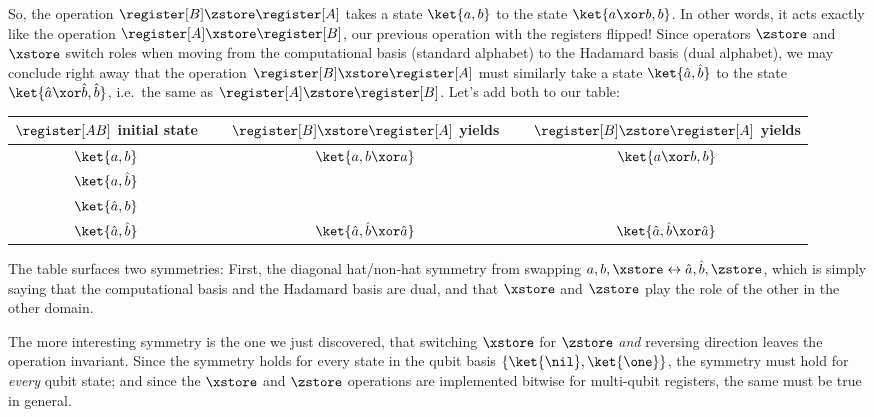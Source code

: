       So, the operation $\register[B] \zstore \register[A]$ takes a state
        $\ket{a,b}$ to the state $\ket{a \xor b, b}$. In other words, it acts
        exactly like the operation $\register[A] \xstore \register[B]$, our
        previous operation with the registers flipped! 
        Since operators $\zstore$ and $\xstore$ switch
        roles when moving from the computational basis (standard alphabet)
        to the Hadamard basis (dual alphabet), we may conclude right away 
        that the operation $\register[B] \xstore \register[A]$ must similarly
        take a state $\ket{\hat a, \hat b}$ to the state $\ket{\hat a \xor \hat b, \hat b}$,
        i.e.\ the same as $\register[A] \zstore \register[B]$.
        Let's add both to our table:
      \begin{steptable}
        \setlength{\extrarowheight}{2pt}
        \begin{tabular}{ccc}
          \toprule
          $\register[AB]$ initial state & 
            $\quad$ $\register[B] \xstore \register[A]$ yields $\quad$ & 
            $\register[B] \zstore \register[A]$ yields\\
          \midrule
          $\ket{a,b}$ & $\ket{a,b \xor a}$ & $\ket{a \xor b, b}$ \\
          $\ket{a,\hat b}$ &  &  \\
          $\ket{\hat a, b}$ &  &  \\
          $\ket{\hat a, \hat b}$ & $\ket{\hat a, \hat b \xor \hat a}$ & $\ket{\hat a, \hat b \xor \hat a}$ \\
          \bottomrule
        \end{tabular}
      \end{steptable}

      The table surfaces two symmetries: First, the diagonal hat/non-hat symmetry
        from swapping $a,b,\xstore \leftrightarrow \hat a, \hat b, \zstore$, 
        which is simply saying that the computational basis and the
        Hadamard basis are dual, and that $\xstore$ and $\zstore$ play the role
        of the other in the other domain.

      The more interesting symmetry is the one we just discovered, that switching $\xstore$ for
        $\zstore$ \emph{and} reversing direction leaves the
        operation invariant. 
        Since the symmetry holds for every state in the qubit
        basis $\{\ket{\nil}, \ket{\one}\}$, the symmetry must hold for \emph{every}
        qubit state; and since the $\xstore$ and $\zstore$ operations are
        implemented bitwise for multi-qubit registers, the same must be true in
        general. %

